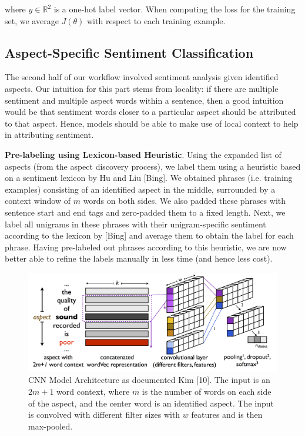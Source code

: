 \documentclass{article} %
\begin{document}
where $y \in \mathbb{R}^2$ is a one-hot label vector. When computing the loss for the training set, we average $J(\theta)$ with respect to each training example.

\subsection{Aspect-Specific Sentiment Classification}
The second half of our workflow involved sentiment analysis given identified aspects. Our intuition for this part stems from locality: if there are multiple sentiment and multiple aspect words within a sentence, then a good intuition would be that sentiment words closer to a particular aspect should be attributed to that aspect. Hence, models should be able to make use of local context to help in attributing sentiment.

\textbf{Pre-labeling using Lexicon-based Heuristic}.
Using the expanded list of aspects (from the aspect discovery process), we label them using a heuristic based on a sentiment lexicon by Hu and Liu [Bing]. We obtained phrases (i.e. training examples) consisting of an identified aspect in the middle, surrounded by a context window of $m$ words on both sides. We also padded these phrases with sentence start and end tags and zero-padded them to a fixed length. Next, we label all unigrams in these phrases with their unigram-specific sentiment according to the lexicon by [Bing] and average them to obtain the label for each phrase. Having pre-labeled out phrases according to this heuristic, we are now better able to refine the labels manually in less time (and hence less cost).


\begin{figure}[ht]
\begin{center}
\includegraphics[width=\columnwidth]{model_architecture.png}
\end{center}
\caption{CNN Model Architecture as documented Kim [10]. The input is an $2m+1$ word context, where $m$ is the number of words on each side of the aspect, and the center word is an identified aspect. The input is convolved with different filter sizes with $w$ features and is then max-pooled.}
\label{architecture}
\end{figure}
\end{document}
